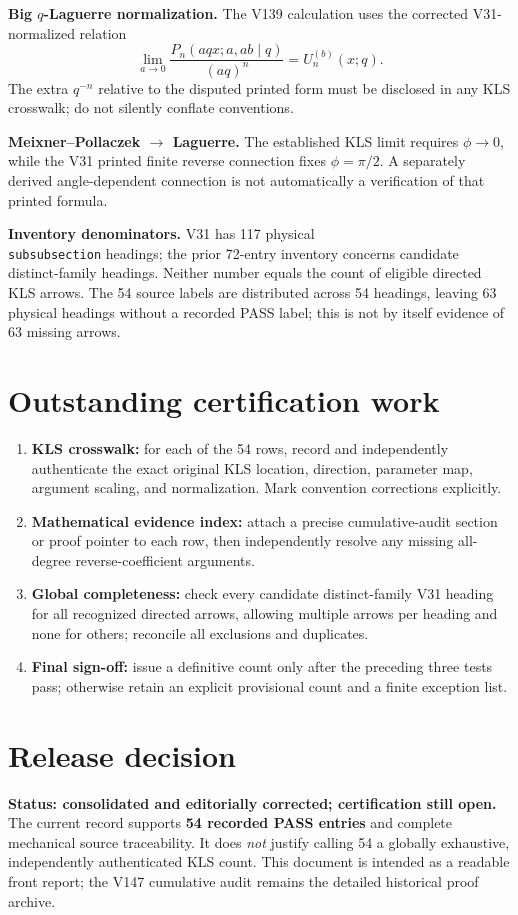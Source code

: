 \documentclass[10pt]{article}
\begin{document}
\textbf{Big $q$-Laguerre normalization.} The V139 calculation uses the corrected V31-normalized relation
\[
\lim_{a\to0}\frac{P_n(aqx;a,ab\mid q)}{(aq)^n}=U_n^{(b)}(x;q).
\]
The extra $q^{-n}$ relative to the disputed printed form must be disclosed in any KLS crosswalk; do not silently conflate conventions.

\textbf{Meixner--Pollaczek $\to$ Laguerre.} The established KLS limit requires $\phi\to0$, while the V31 printed finite reverse connection fixes $\phi=\pi/2$. A separately derived angle-dependent connection is not automatically a verification of that printed formula.

\textbf{Inventory denominators.} V31 has 117 physical \texttt{\\subsubsection} headings; the prior 72-entry inventory concerns candidate distinct-family headings. Neither number equals the count of eligible directed KLS arrows. The 54 source labels are distributed across 54 headings, leaving 63 physical headings without a recorded PASS label; this is not by itself evidence of 63 missing arrows.

\section{Outstanding certification work}
\begin{enumerate}
\item \textbf{KLS crosswalk:} for each of the 54 rows, record and independently authenticate the exact original KLS location, direction, parameter map, argument scaling, and normalization. Mark convention corrections explicitly.
\item \textbf{Mathematical evidence index:} attach a precise cumulative-audit section or proof pointer to each row, then independently resolve any missing all-degree reverse-coefficient arguments.
\item \textbf{Global completeness:} check every candidate distinct-family V31 heading for all recognized directed arrows, allowing multiple arrows per heading and none for others; reconcile all exclusions and duplicates.
\item \textbf{Final sign-off:} issue a definitive count only after the preceding three tests pass; otherwise retain an explicit provisional count and a finite exception list.
\end{enumerate}

\section{Release decision}
\textbf{Status: consolidated and editorially corrected; certification still open.} The current record supports \textbf{54 recorded PASS entries} and complete mechanical source traceability. It does \emph{not} justify calling 54 a globally exhaustive, independently authenticated KLS count. This document is intended as a readable front report; the V147 cumulative audit remains the detailed historical proof archive.
\end{document}
